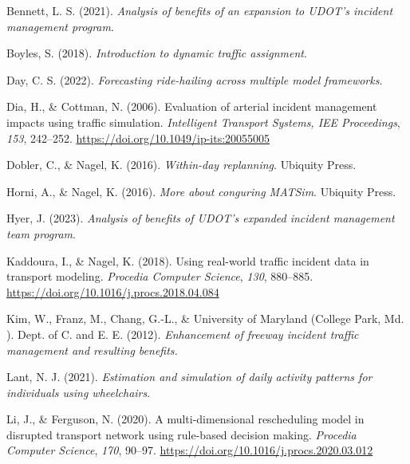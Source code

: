 \documentclass[fancy, oneside, mastersfancy, ms]{byuthesis}
\newlength{\cslhangindent}
\newlength{\cslentryspacingunit} %
\newenvironment{CSLReferences}[2] %
 {%
  \setlength{\parindent}{0pt}
  \ifodd #1
  \let\oldpar\par
  \def\par{\hangindent=\cslhangindent\oldpar}
  \fi
  \setlength{\parskip}{#2\cslentryspacingunit}
 }%
 {}
\begin{document}
\hypertarget{refs}{}
\begin{CSLReferences}{1}{0}
\leavevmode{}%
Bennett, L. S. (2021). \emph{Analysis of benefits of an expansion to
UDOT's incident management program}.

\leavevmode{}%
Boyles, S. (2018). \emph{Introduction to dynamic traffic assignment}.

\leavevmode{}%
Day, C. S. (2022). \emph{Forecasting ride-hailing across multiple model
frameworks}.

\leavevmode{}%
Dia, H., \& Cottman, N. (2006). Evaluation of arterial incident
management impacts using traffic simulation. \emph{Intelligent Transport
Systems, IEE Proceedings}, \emph{153}, 242--252.
\url{https://doi.org/10.1049/ip-its:20055005}

\leavevmode{}%
Dobler, C., \& Nagel, K. (2016). \emph{Within-day replanning}. {Ubiquity
Press}.

\leavevmode{}%
Horni, A., \& Nagel, K. (2016). \emph{More about conguring MATSim}.
{Ubiquity Press}.

\leavevmode{}%
Hyer, J. (2023). \emph{Analysis of benefits of UDOT's expanded incident
management team program}.

\leavevmode{}%
Kaddoura, I., \& Nagel, K. (2018). Using real-world traffic incident
data in transport modeling. \emph{Procedia Computer Science},
\emph{130}, 880--885. \url{https://doi.org/10.1016/j.procs.2018.04.084}

\leavevmode{}%
Kim, W., Franz, M., Chang, G.-L., \& University of Maryland (College
Park, Md. ). Dept. of C. and E. E. (2012). \emph{Enhancement of freeway
incident traffic management and resulting benefits.}

\leavevmode{}%
Lant, N. J. (2021). \emph{Estimation and simulation of daily activity
patterns for individuals using wheelchairs}.

\leavevmode{}%
Li, J., \& Ferguson, N. (2020). A multi-dimensional rescheduling model
in disrupted transport network using rule-based decision making.
\emph{Procedia Computer Science}, \emph{170}, 90--97.
\url{https://doi.org/10.1016/j.procs.2020.03.012}


\end{CSLReferences}
\end{document}
